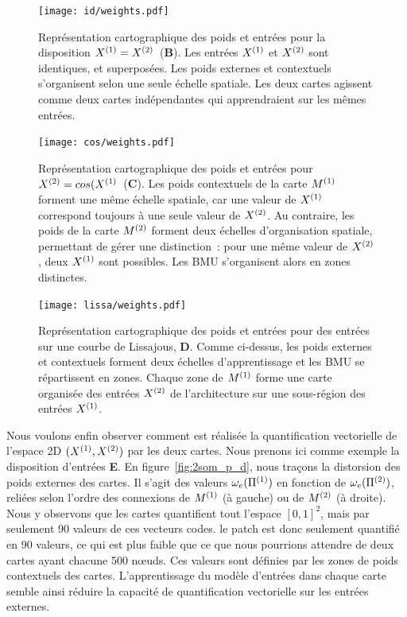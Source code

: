 \documentclass[../main]{subfiles}
\begin{document}
\begin{figure}
\begin{minipage}{\textwidth}
	\centering\texttt{[image: id/weights.pdf]}
	\vspace{-0.3cm}
	\caption{Représentation cartographique des poids et entrées pour la disposition $X^{({1})} = X^{({2})}$~(\textbf{B}). Les entrées $X^{({1})}$ et $X^{({2})}$ sont identiques, et superposées.
	Les poids externes et contextuels s'organisent selon une seule échelle spatiale.
	Les deux cartes agissent comme deux cartes indépendantes qui apprendraient sur les mêmes entrées. \label{fig:id_results}}
	\centering\texttt{[image: cos/weights.pdf]}
	\vspace{-0.3cm}
\caption{Représentation cartographique des poids et entrées pour $X^{({2})} = cos(X^{({1})}$~(\textbf{C}). Les poids contextuels de la carte $M^{({1})}$ forment une même échelle spatiale, car une valeur de $X^{({1})}$ correspond toujours à une seule valeur de $X^{({2})}$. Au contraire, les poids de la carte $M^{({2})}$ forment deux échelles d'organisation spatiale, permettant de gérer une distinction~: pour une même valeur de $X^{({2})}$, deux $X^{({1})}$ sont possibles. Les BMU s'organisent alors en zones distinctes.
\label{fig:cos_results}}
	\centering\texttt{[image: lissa/weights.pdf]}
	\vspace{-0.3cm}
	\caption{Représentation cartographique des poids et entrées pour des entrées sur une courbe de Lissajous, \textbf{D}.
	Comme ci-dessus, les poids externes et contextuels forment deux échelles d'apprentissage et les BMU se répartissent en zones.
	Chaque zone de $M^{({1})}$ forme une carte organisée des entrées $X^{({2})}$ de l'architecture sur une sous-région des entrées $X^{({1})}$. \label{fig:lissa}}
\end{minipage}
\end{figure}

Nous voulons enfin observer comment est réalisée la quantification vectorielle de l'espace 2D $(X^{({1})}, X^{({2})})$ par les deux cartes. Nous prenons ici comme exemple la disposition d'entrées \textbf{E}.
En figure~\ref{fig:2som_p_d}, nous traçons la distorsion des poids externes des cartes. Il s'agit des valeurs $\omega_e(\Pi^{({1})})$ en fonction de $\omega_e(\Pi^{({2})})$, reliées selon l'ordre des connexions de $M^{({1})}$ (à gauche) ou de $M^{({2})}$ (à droite).
Nous y observons que les cartes quantifient tout l'espace $[0,1]^2$, mais par seulement 90 valeurs de ces vecteurs codes. le patch est donc seulement quantifié en 90 valeurs, ce qui est plus faible que ce que nous pourrions attendre de deux cartes ayant chacune 500 n\oe{}uds. 
Ces valeurs sont définies par les zones de poids contextuels des cartes. L'apprentissage du modèle d'entrées dans chaque carte semble ainsi réduire la capacité de quantification vectorielle sur les entrées externes.
\end{document}
